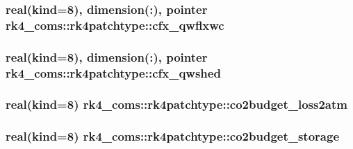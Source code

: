 \subsubsection[{cfx\+\_\+qwflxwc}]{\setlength{\rightskip}{0pt plus 5cm}real(kind=8), dimension(\+:), pointer rk4\+\_\+coms\+::rk4patchtype\+::cfx\+\_\+qwflxwc}\label{structrk4__coms_1_1rk4patchtype_a4ce3e18ac5064a584fcf9db30fe939dd}
\hypertarget{structrk4__coms_1_1rk4patchtype_a152ab5751f74159311c190823adcfb3b}{}
\subsubsection[{cfx\+\_\+qwshed}]{\setlength{\rightskip}{0pt plus 5cm}real(kind=8), dimension(\+:), pointer rk4\+\_\+coms\+::rk4patchtype\+::cfx\+\_\+qwshed}\label{structrk4__coms_1_1rk4patchtype_a152ab5751f74159311c190823adcfb3b}
\hypertarget{structrk4__coms_1_1rk4patchtype_af0dfb98a6d25f6930335540f620fa56b}{}
\subsubsection[{co2budget\+\_\+loss2atm}]{\setlength{\rightskip}{0pt plus 5cm}real(kind=8) rk4\+\_\+coms\+::rk4patchtype\+::co2budget\+\_\+loss2atm}\label{structrk4__coms_1_1rk4patchtype_af0dfb98a6d25f6930335540f620fa56b}
\hypertarget{structrk4__coms_1_1rk4patchtype_aa7c6982ce419cd526a23e7a8ed6c3a65}{}
\subsubsection[{co2budget\+\_\+storage}]{\setlength{\rightskip}{0pt plus 5cm}real(kind=8) rk4\+\_\+coms\+::rk4patchtype\+::co2budget\+\_\+storage}\label{structrk4__coms_1_1rk4patchtype_aa7c6982ce419cd526a23e7a8ed6c3a65}
\hypertarget{structrk4__coms_1_1rk4patchtype_a70eda468a5a061c5465e13483a1cb415}{}
